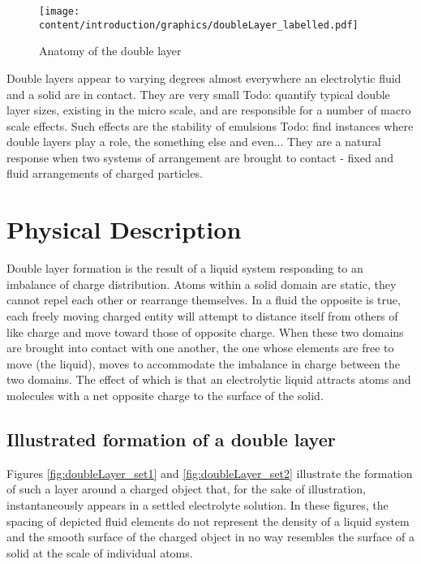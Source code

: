 
\begin{figure}
    \begin{center}
        \texttt{[image: content/introduction/graphics/doubleLayer\_labelled.pdf]}
    \end{center}
    \caption{Anatomy of the double layer}
    \label{fig:doubleLayer_anatomy}
\end{figure}

Double layers appear to varying degrees almost everywhere an electrolytic fluid and a solid are in contact. They are very small {Todo: quantify typical double layer sizes}, existing in the micro scale, and are responsible for a number of macro scale effects. Such effects are the stability of emulsions {Todo: find instances where double layers play a role}, the something else and even... They are a natural response when two systems of arrangement are brought to contact - fixed and fluid arrangements of charged particles.

\section{Physical Description}
    Double layer formation is the result of a liquid system responding to an imbalance of charge distribution. Atoms within a solid domain are static, they cannot repel each other or rearrange themselves. In a fluid the opposite is true, each freely moving charged entity will attempt to distance itself from others of like charge and move toward those of opposite charge. When these two domains are brought into contact with one another, the one whose elements are free to move (the liquid), moves to accommodate the imbalance in charge between the two domains. The effect of which is that an electrolytic liquid attracts atoms and molecules with a net opposite charge to the surface of the solid.

\subsection{Illustrated formation of a double layer}
    Figures \ref{fig:doubleLayer_set1} and \ref{fig:doubleLayer_set2} illustrate the formation of such a layer around a charged object that, for the sake of illustration, instantaneously appears in a settled electrolyte solution. In these figures, the spacing of depicted fluid elements do not represent the density of a liquid system and the smooth surface of the charged object in no way resembles the surface of a solid at the scale of individual atoms.

